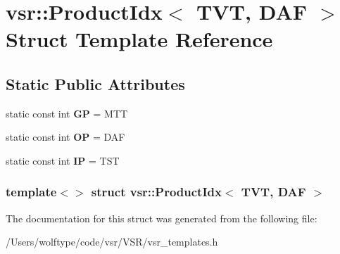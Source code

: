 \hypertarget{structvsr_1_1_product_idx_3_01_t_v_t_00_01_d_a_f_01_4}{\section{vsr\-:\-:Product\-Idx$<$ T\-V\-T, D\-A\-F $>$ Struct Template Reference}
\label{structvsr_1_1_product_idx_3_01_t_v_t_00_01_d_a_f_01_4}
}
\subsection*{Static Public Attributes}
\begin{DoxyCompactItemize}
\item 
\hypertarget{structvsr_1_1_product_idx_3_01_t_v_t_00_01_d_a_f_01_4_a33528428efcb79fc8212148c6497e7a1}{static const int {\bfseries G\-P} = M\-T\-T}\label{structvsr_1_1_product_idx_3_01_t_v_t_00_01_d_a_f_01_4_a33528428efcb79fc8212148c6497e7a1}

\item 
\hypertarget{structvsr_1_1_product_idx_3_01_t_v_t_00_01_d_a_f_01_4_a229bbe2e70367e0d6273230b9c644bc1}{static const int {\bfseries O\-P} = D\-A\-F}\label{structvsr_1_1_product_idx_3_01_t_v_t_00_01_d_a_f_01_4_a229bbe2e70367e0d6273230b9c644bc1}

\item 
\hypertarget{structvsr_1_1_product_idx_3_01_t_v_t_00_01_d_a_f_01_4_a2f0e71827b64934001915151c7fcc3c9}{static const int {\bfseries I\-P} = T\-S\-T}\label{structvsr_1_1_product_idx_3_01_t_v_t_00_01_d_a_f_01_4_a2f0e71827b64934001915151c7fcc3c9}

\end{DoxyCompactItemize}
\subsubsection*{template$<$$>$ struct vsr\-::\-Product\-Idx$<$ T\-V\-T, D\-A\-F $>$}



The documentation for this struct was generated from the following file\-:\begin{DoxyCompactItemize}
\item 
/\-Users/wolftype/code/vsr/\-V\-S\-R/vsr\-\_\-templates.\-h\end{DoxyCompactItemize}
